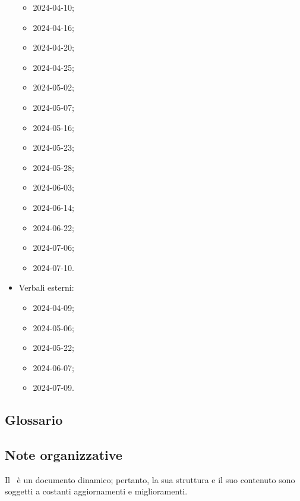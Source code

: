\begin{itemize}
\begin{itemize}
    \item 2024-04-10;
    \item 2024-04-16;
    \item 2024-04-20;
    \item 2024-04-25;
    \item 2024-05-02;
    \item 2024-05-07;
    \item 2024-05-16;
    \item 2024-05-23;
    \item 2024-05-28;
    \item 2024-06-03;
    \item 2024-06-14;
    \item 2024-06-22;
    \item 2024-07-06;
    \item 2024-07-10.
  \end{itemize}
  \item Verbali esterni:
  \begin{itemize}
    \item 2024-04-09;
    \item 2024-05-06;
    \item 2024-05-22;
    \item 2024-06-07;
    \item 2024-07-09.
  \end{itemize}
\end{itemize}

\subsection{Glossario} 
\GlossarioIntroduzione

\subsection{Note organizzative}

\par Il \PdQ\ è un documento dinamico; pertanto, la sua struttura e il suo contenuto sono soggetti a costanti aggiornamenti e miglioramenti.

